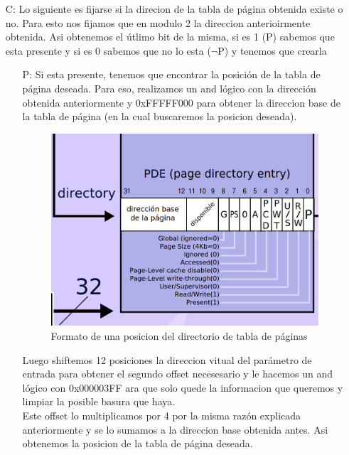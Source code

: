 \begin{itemize}
	 \item[C:] Lo siguiente es fijarse si la direcion de la tabla de página obtenida existe o no. Para esto nos fijamos que en modulo 2 la direccion anterioirmente obtenida. Asi obtenemos el útlimo bit de la misma, si es 1 (P) sabemos que esta presente y si es 0 sabemos que no lo esta ($\neg$P) y tenemos que crearla
	 \begin{itemize}
	  \item[P: ] Si esta presente, tenemos que encontrar la posición de la tabla de página deseada. Para eso, realizamos un and lógico con la dirección obtenida anteriormente y  0xFFFFF000 para obtener la direccion base de la tabla de página (en la cual buscaremos la posicion deseada).

	 \begin{figure}[H]
	 \begin{center}
  	 \includegraphics[width=\linewidth]{ejercicio3/fun2.png}
  	 \caption{{\small Formato de una posicion del directorio de tabla de páginas}}
	 \endminipage
	 \end{center}
	 \end{figure}

	  Luego shiftemos 12 posiciones la direccion vitual del parámetro de entrada para obtener el segundo offset necesesario y le hacemos un and lógico con 0x000003FF ara que solo quede la informacion que queremos y limpiar la posible basura que haya. \\

	  Este offset lo multiplicamos por 4 por la misma razón explicada anteriormente y se lo sumamos a la direccion base obtenida antes. Asi obtenemos la posicion de la tabla de página deseada.\\


\end{itemize}
\end{itemize}
